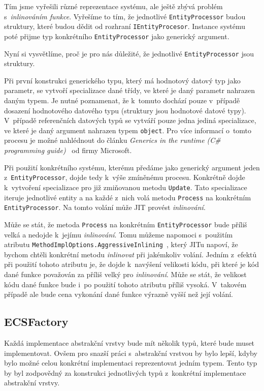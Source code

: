 Tím jsme vyřešili různé reprezentace systému, ale ještě zbývá problém s~\textit{inlinováním funkce}. Vyřešíme to tím, že jednotlivé \verb|EntityProcessor| budou struktury, které budou dědit od rozhraní \verb|IEntityProcesor|. Instance systému poté přijme typ konkrétního \verb|EntityProcessor| jako generický argument.

Nyní si vysvětlíme, proč je pro nás důležité, že jednotlivé \verb|EntityProcessor| jsou struktury.

Při první konstrukci generického typu, který má hodnotový datový typ jako parametr, se vytvoří specializace dané třídy, ve které je daný parametr nahrazen daným typem. Je nutné poznamenat, že k~tomuto dochází pouze v~případě dosazení hodnotového datového typu (struktury jsou hodnotové datové typy). V~případě referenčních datových typů se vytváří pouze jedna jediná specializace, ve které je daný argument nahrazen typem \verb|object|. Pro více informací o~tomto procesu je možné nahlédnout do článku \textit{Generics in the runtime (C\# programming guide)}~\cite{GenericsInTheRuntime} od firmy Microsoft.

Při použití konkrétního systému, kterému předáme jako generický argument jeden z~\verb|EntityProcessor|, dojde tedy k~výše zmíněnému procesu. Konkrétně dojde k~vytvoření specializace pro již zmiňovanou metodu \verb|Update|. Tato specializace iteruje jednotlivé entity a na každé z~nich volá metodu \verb|Process| na konkrétním \verb|EntityProcessor|. Na tomto volání může JIT provést \textit{inlinování}.

Může se stát, že metoda \verb|Process| na konkrétním \verb|EntityProcessor| bude příliš velká a nedojde k~jejímu \textit{inlinování}. Tomu můžeme napomoci s~použitím atributu \verb|MethodImplOptions.AggressiveInlining|~\cite{MethodImplOptions}, který JITu napoví, že bychom chtěli konkrétní metodu \textit{inlinovat} při jakémkoliv volání. Jedním z~efektů při použití tohoto atributu je, že dojde k~navýšení velikosti kódu, při které je kód dané funkce považován za příliš velký pro \textit{inlinování}. Může se stát, že velikost kódu dané funkce bude i~po použití tohoto atributu příliš vysoká. V~takovém případě ale bude cena vykonání dané funkce výrazně vyšší než její volání. 

\subsection{ECSFactory}
Každá implementace abstrakční vrstvy bude mít několik typů, které bude muset implementovat. Ovšem pro snazší práci s~abstrakční vrstvou by bylo lepší, kdyby bylo možné celou konkrétní implementaci reprezentovat jedním typem. Tento typ by byl zodpovědný za konstrukci jednotlivých typů z~konkrétní implementace abstrakční vrstvy.

